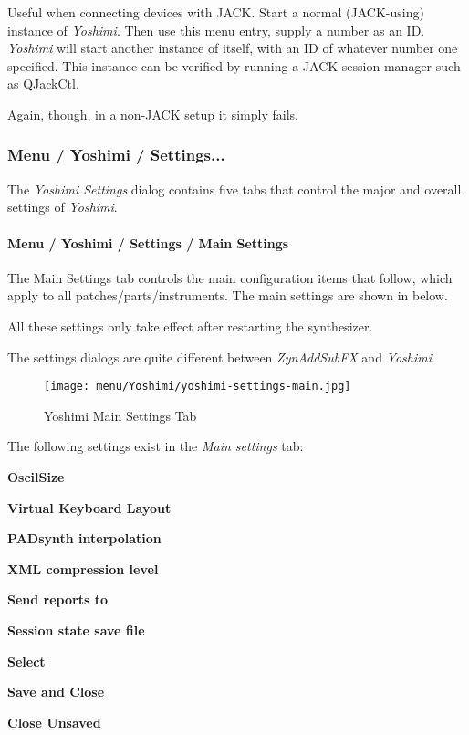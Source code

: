    Useful when connecting devices with JACK.
   Start a normal (JACK-using) instance of \textsl{Yoshimi}.
   Then use this menu entry, supply a number as an ID.
   \textsl{Yoshimi} will start another instance
   of itself, with an ID of whatever number one specified.
   This instance can be verified by running a JACK session manager such as
   QJackCtl.

   Again, though, in a non-JACK setup it simply fails.  

\subsubsection{Menu / Yoshimi / Settings...}
\label{subsubsec:menu_yoshimi_settings}

   The \textsl{Yoshimi Settings} dialog contains five tabs that control the
   major and overall settings of \textsl{Yoshimi}.
   
\paragraph{Menu / Yoshimi / Settings / Main Settings}
\label{paragraph:menu_yoshimi_settings_main_settings}

   The Main Settings tab controls the main configuration items that
   follow, which apply to all patches/parts/instruments.
   The main settings are shown in
    below.

   All these settings only take effect after restarting the synthesizer.

   The settings dialogs are quite different between \textsl{ZynAddSubFX} and
   \textsl{Yoshimi}.

\begin{figure}[H]
   \centering 
   \texttt{[image: menu/Yoshimi/yoshimi-settings-main.jpg]}
   \caption{Yoshimi Main Settings Tab}
   \label{fig:yoshimi_main_settings_dialog}
\end{figure}

   The following settings exist in the \textsl{Main settings} tab:

   \begin{enumber}
      \item \textbf{OscilSize}
      \item \textbf{Virtual Keyboard Layout}
      \item \textbf{PADsynth interpolation}
      \item \textbf{XML compression level}
      \item \textbf{Send reports to}
      \item \textbf{Session state save file}
      \item \textbf{Select}
      \item \textbf{Save and Close}
      \item \textbf{Close Unsaved}
   \end{enumber}

